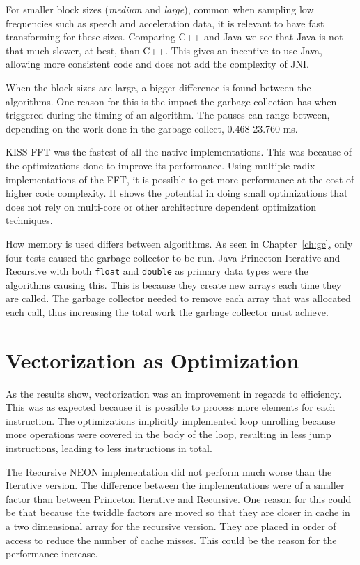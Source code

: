 For smaller block sizes (\emph{medium} and \emph{large}), common when sampling low frequencies such as speech and acceleration data, it is relevant to have fast transforming for these sizes. Comparing C++ and Java we see that Java is not that much slower, at best, than C++. This gives an incentive to use Java, allowing more consistent code and does not add the complexity of JNI.

When the block sizes are large, a bigger difference is found between the algorithms. One reason for this is the impact the garbage collection has when triggered during the timing of an algorithm. The pauses can range between, depending on the work done in the garbage collect, 0.468-23.760 ms.

KISS FFT was the fastest of all the native implementations. This was because of the optimizations done to improve its performance. Using multiple radix implementations of the FFT, it is possible to get more performance at the cost of higher code complexity. It shows the potential in doing small optimizations that does not rely on multi-core or other architecture dependent optimization techniques.

How memory is used differs between algorithms. As seen in Chapter~\ref{ch:gc}, only four tests caused the garbage collector to be run. Java Princeton Iterative and Recursive with both \texttt{float} and \texttt{double} as primary data types were the algorithms causing this. This is because they create new arrays each time they are called. The garbage collector needed to remove each array that was allocated each call, thus increasing the total work the garbage collector must achieve.

\section{Vectorization as Optimization}

As the results show, vectorization was an improvement in regards to efficiency. This was as expected because it is possible to process more elements for each instruction. The optimizations implicitly implemented loop unrolling because more operations were covered in the body of the loop, resulting in less jump instructions, leading to less instructions in total.

The Recursive NEON implementation did not perform much worse than the Iterative version. The difference between the implementations were of a smaller factor than between Princeton Iterative and Recursive. One reason for this could be that because the twiddle factors are moved so that they are closer in cache in a two dimensional array for the recursive version. They are placed in order of access to reduce the number of cache misses. This could be the reason for the performance increase.


